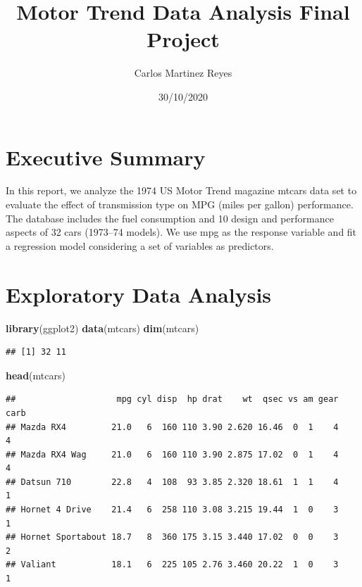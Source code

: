 \documentclass[]{article}
\title{Motor Trend Data Analysis Final Project}
\author{Carlos Martinez Reyes}
\date{30/10/2020}
\newenvironment{Shaded}{\begin{snugshade}}{\end{snugshade}}
\newcommand{\KeywordTok}[1]{\textcolor[rgb]{0.13,0.29,0.53}{\textbf{#1}}}
\newcommand{\NormalTok}[1]{#1}
\begin{document}
\maketitle

\hypertarget{executive-summary}{%
\section{Executive Summary}\label{executive-summary}}

In this report, we analyze the 1974 US Motor Trend magazine mtcars data
set to evaluate the effect of transmission type on MPG (miles per
gallon) performance. The database includes the fuel consumption and 10
design and performance aspects of 32 cars (1973--74 models). We use mpg
as the response variable and fit a regression model considering a set of
variables as predictors.

\hypertarget{exploratory-data-analysis}{%
\section{Exploratory Data Analysis}\label{exploratory-data-analysis}}

\begin{Shaded}
\begin{Highlighting}[]
\KeywordTok{library}\NormalTok{(ggplot2)}
\KeywordTok{data}\NormalTok{(mtcars)}
\KeywordTok{dim}\NormalTok{(mtcars)}
\end{Highlighting}
\end{Shaded}

\begin{verbatim}
## [1] 32 11
\end{verbatim}

\begin{Shaded}
\begin{Highlighting}[]
\KeywordTok{head}\NormalTok{(mtcars)}
\end{Highlighting}
\end{Shaded}

\begin{verbatim}
##                    mpg cyl disp  hp drat    wt  qsec vs am gear carb
## Mazda RX4         21.0   6  160 110 3.90 2.620 16.46  0  1    4    4
## Mazda RX4 Wag     21.0   6  160 110 3.90 2.875 17.02  0  1    4    4
## Datsun 710        22.8   4  108  93 3.85 2.320 18.61  1  1    4    1
## Hornet 4 Drive    21.4   6  258 110 3.08 3.215 19.44  1  0    3    1
## Hornet Sportabout 18.7   8  360 175 3.15 3.440 17.02  0  0    3    2
## Valiant           18.1   6  225 105 2.76 3.460 20.22  1  0    3    1
\end{verbatim}
\end{document}
